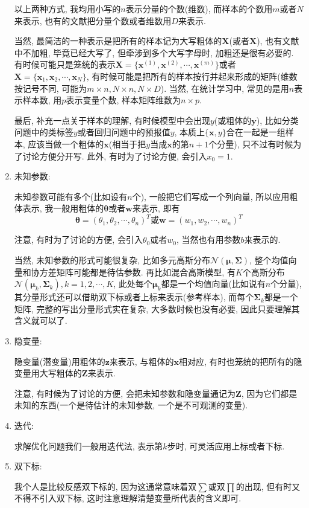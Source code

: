 \documentclass[a4paper,UTF8]{ctexart}
\theoremstyle{plain} \newtheorem{theorem}{定理}[section]
\theoremstyle{plain} \newtheorem{definition}{定义}[section]
\theoremstyle{plain} \newtheorem{lemma}{引理}[section]
\theoremstyle{plain} \newtheorem{proposition}{命题}[section]
\theoremstyle{plain} \newtheorem{example}{例}[section]
\theoremstyle{plain} \newtheorem{remark}{注}[section]
\theoremstyle{plain} \newtheorem{corollary}{推论}[section]
\begin{document}
\begin{enumerate}[(1)]
以上两种方式, 我均用小写的$n$表示分量的个数(维数), 而样本的个数用$m$或者$N$来表示, 也有的文献把分量个数或者维数用$D$来表示.

当然, 最简洁的一种表示是把所有的样本记为大写粗体的$\bm{X}$(或者$\mathbf{X}$), 也有文献中不加粗, 毕竟已经大写了, 但牵涉到多个大写字母时, 加粗还是很有必要的. 有时候可能只是笼统的表示$\bm{X} = \{ \bm{x}^{(1)}, \bm{x}^{(2)}, \cdots, \bm{x}^{(m)} \}$或者$\bm{X} = \{ \bm{x}_{1}, \bm{x}_{2}, \cdots, \bm{x}_{N}\}$, 有时候可能是把所有的样本按行并起来形成的矩阵(维数按记号不同, 可能为$m \times n, N \times n, N \times D$). 当然, 在统计学习中, 常见的是用$n$表示样本数, 用$p$表示变量个数, 样本矩阵维数为$n \times p$.

最后, 补充一点关于样本的理解, 有时候模型中会出现$y$(或粗体的$\bm{y}$), 比如分类问题中的类标签$y$或者回归问题中的预报值$y$, 本质上$\{\bm{x}, y\}$合在一起是一组样本, 应该当做一个粗体的$\bm{x}$(相当于把$y$当成$\bm{x}$的第$n + 1$个分量), 只不过有时候为了讨论方便分开写. 此外, 有时为了讨论方便, 会引入$x_{0} = 1$.

\item 未知参数:

未知参数可能有多个(比如设有$n$个), 一般把它们写成一个列向量, 所以应用粗体表示, 我一般用粗体的$\bm{\theta}$或者$\bm{w}$来表示, 即有
\begin{equation*}
\bm{\theta} = (\theta_{1}, \theta_{2}, \cdots, \theta_{n})^{T}  \textrm{或} \bm{w} = (w_{1}, w_{2}, \cdots, w_{n})^{T}
\end{equation*}

注意, 有时为了讨论的方便, 会引入$\theta_{0}$或者$w_{0}$, 当然也有用参数$b$来表示的.

当然, 未知参数的形式可能很复杂, 比如多元高斯分布$\mathcal{N}(\bm{\mu}, \bm{\Sigma})$, 整个均值向量和协方差矩阵可能都是待估参数. 再比如混合高斯模型, 有$K$个高斯分布$\mathcal{N}(\bm{\mu}_{k}, \bm{\Sigma}_{k}), k = 1, 2, \cdots, K$, 此处每个$\bm{\mu}_{k}$都是一个均值向量(比如说有$n$个分量), 其分量形式还可以借助双下标或者上标来表示(参考样本), 而每个$\bm{\Sigma}_{k}$都是一个矩阵, 完整的写出分量形式实在复杂, 大多数时候也没有必要, 因此只要理解其含义就可以了.

\item 隐变量:

隐变量(潜变量)用粗体的$\bm{z}$来表示, 与粗体的$\bm{x}$相对应, 有时也笼统的把所有的隐变量用大写粗体的$\bm{Z}$来表示.

注意, 有时候为了讨论的方便, 会把未知参数和隐变量通记为$\bm{Z}$, 因为它们都是未知的东西(一个是待估计的未知参数, 一个是不可观测的变量).

\item 迭代:

求解优化问题我们一般用迭代法, 表示第$k$步时, 可灵活应用上标或者下标.

\item 双下标:

我个人是比较反感双下标的, 因为这通常意味着双$\sum$或双$\prod$的出现, 但有时又不得不引入双下标, 这时注意理解清楚变量所代表的含义即可.

\end{enumerate}
\end{document}
